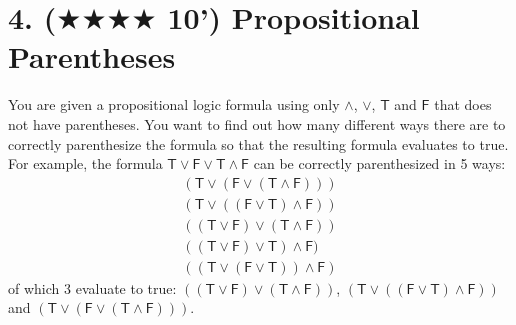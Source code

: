 \documentclass{article}
\begin{document}
\section*{4. ($\bigstar\bigstar\bigstar\bigstar$ 10') Propositional Parentheses}
You are given a propositional logic formula using only $\land$, $\lor$, $\mathsf{T}$ and $\mathsf{F}$ that does not have parentheses. You want to find out how many different ways there are to correctly parenthesize the formula so that the resulting formula evaluates to true. For example, the formula $\mathsf{T}\lor\mathsf{F}\lor\mathsf{T}\land\mathsf{F}$ can be correctly parenthesized in 5 ways:
\begin{align*}
(\mathsf{T}\lor(\mathsf{F}\lor(\mathsf{T}\land\mathsf{F}))) \\
(\mathsf{T}\lor((\mathsf{F}\lor\mathsf{T})\land\mathsf{F})) \\
((\mathsf{T}\lor\mathsf{F})\lor(\mathsf{T}\land\mathsf{F})) \\
((\mathsf{T}\lor\mathsf{F})\lor\mathsf{T})\land\mathsf{F}) \\
((\mathsf{T}\lor(\mathsf{F}\lor\mathsf{T}))\land\mathsf{F})
\end{align*}
of which 3 evaluate to true: $((\mathsf{T}\lor\mathsf{F})\lor(\mathsf{T}\land\mathsf{F}))$, $(\mathsf{T}\lor((\mathsf{F}\lor\mathsf{T})\land\mathsf{F}))$ and $(\mathsf{T}\lor(\mathsf{F}\lor(\mathsf{T}\land\mathsf{F})))$.
\end{document}
